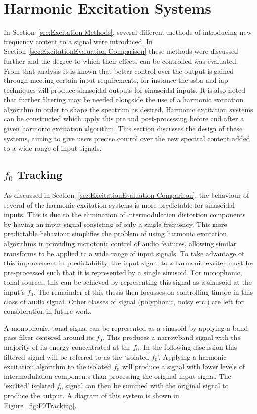 \section{Harmonic Excitation Systems}
\label{sec:FeatureControl-Systems}
	In Section~\ref{sec:Excitation-Methods}, several different methods of introducing new frequency content to a signal
	were introduced. In Section~\ref{sec:ExcitationEvaluation-Comparison} these methods were discussed further and the
	degree to which their effects can be controlled was evaluated. From that analysis it is known that better control
	over the output is gained through meeting certain input requirements, for instance the \acrshort{ssba} and
	\acrshort{iap} techniques will produce sinusoidal outputs for sinusoidal inputs. It is also noted that further
	filtering may be needed alongside the use of a harmonic excitation algorithm in order to shape the spectrum as
	desired. Harmonic excitation systems can be constructed which apply this pre and post-processing before and after a
	given harmonic excitation algorithm. This section discusses the design of these systems, aiming to give users
	precise control over the new spectral content added to a wide range of input signals.

	\subsection{$f_{0}$ Tracking}
	\label{sec:FeatureControl-Systems-Fundamental}
		As discussed in Section~\ref{sec:ExcitationEvaluation-Comparison}, the behaviour of several of the harmonic
		excitation systems is more predictable for sinusoidal inputs. This is due to the elimination of
		intermodulation distortion components by having an input signal consisting of only a single frequency. This
		more predictable behaviour simplifies the problem of using harmonic excitation algorithms in providing
		monotonic control of audio features, allowing similar transforms to be applied to a wide range of input
		signals. To take advantage of this improvement in predictability, the input signal to a harmonic exciter
		must be pre-processed such that it is represented by a single sinusoid. For monophonic, tonal sources, this
		can be achieved by representing this signal as a sinusoid at the input's $f_{0}$. The remainder of this
		thesis then focusses on controlling timbre in this class of audio signal. Other classes of signal
		(polyphonic, noisy etc.) are left for consideration in future work.
		
		A monophonic, tonal signal can be represented as a sinusoid by applying a band pass filter centered around
		its $f_{0}$. This produces a narrowband signal with the majority of its energy concentrated at the $f_{0}$.
		In the following discussion this filtered signal will be referred to as the `isolated $f_{0}$'. Applying a
		harmonic excitation algorithm to the isolated $f_{0}$ will produce a signal with lower levels of
		intermodulation components than processing the original input signal. The `excited' isolated $f_{0}$ signal
		can then be summed with the original signal to produce the output. A diagram of this system is shown in
		Figure~\ref{fig:F0Tracking}.

